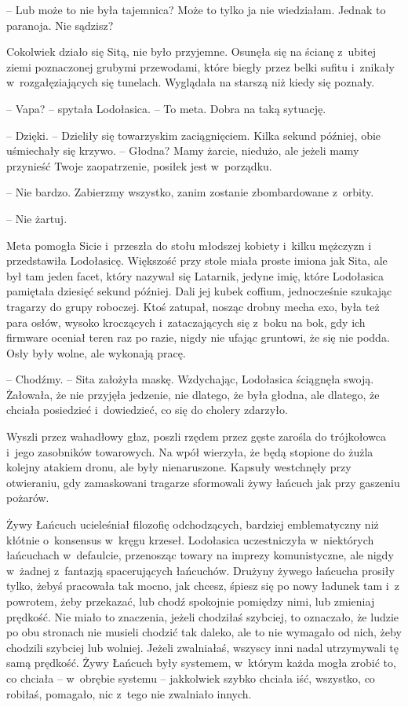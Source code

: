 \documentclass[oneside,polish,11pt,sfheadings]{mwbk}
\begin{document}
-- Lub może to nie była tajemnica? Może to tylko ja nie wiedziałam.
Jednak to paranoja. Nie sądzisz?

Cokolwiek działo się Sitą, nie było przyjemne. Osunęła się na ścianę z~ubitej ziemi poznaczonej grubymi przewodami, które biegły przez belki
sufitu i~znikały w~rozgałęziających się tunelach. Wyglądała na starszą
niż kiedy się poznały.

-- Vapa? -- spytała Lodołasica. -- To meta. Dobra na taką sytuację.

-- Dzięki. -- Dzieliły się towarzyskim zaciągnięciem. Kilka sekund
później, obie uśmiechały się krzywo. -- Głodna? Mamy żarcie, niedużo, ale
jeżeli mamy przynieść Twoje zaopatrzenie, posiłek jest w~porządku.

-- Nie bardzo. Zabierzmy wszystko, zanim zostanie zbombardowane z~orbity.

-- Nie żartuj.

Meta pomogła Sicie i~przeszła do stołu młodszej kobiety i~kilku mężczyzn
i przedstawiła Lodołasicę. Większość przy stole miała proste imiona jak
Sita, ale był tam jeden facet, który nazywał się Latarnik, jedyne imię,
które Lodołasica pamiętała dziesięć sekund później. Dali jej kubek
coffium, jednocześnie szukając tragarzy do grupy roboczej. Ktoś zatupał,
nosząc drobny mecha exo, była też para osłów, wysoko kroczących i~zataczających się z~boku na bok, gdy ich firmware oceniał teren raz po
razie, nigdy nie ufając gruntowi, że się nie podda. Osły były wolne, ale
wykonają pracę.

-- Chodźmy. -- Sita założyła maskę. Wzdychając, Lodołasica ściągnęła
swoją. Żałowała, że nie przyjęła jedzenie, nie dlatego, że była głodna,
ale dlatego, że chciała posiedzieć i~dowiedzieć, co się do cholery
zdarzyło.

Wyszli przez wahadłowy głaz, poszli rzędem przez gęste zarośla do
trójkołowca i~jego zasobników towarowych. Na wpół wierzyła, że będą
stopione do żużla kolejny atakiem dronu, ale były nienaruszone. Kapsuły
westchnęły przy otwieraniu, gdy zamaskowani tragarze sformowali żywy
łańcuch jak przy gaszeniu pożarów.

Żywy Łańcuch ucieleśniał filozofię odchodzących, bardziej emblematyczny
niż kłótnie o~konsensus w~kręgu krzeseł. Lodołasica uczestniczyła w~niektórych łańcuchach w~defaulcie, przenosząc towary na imprezy
komunistyczne, ale nigdy w~żadnej z~fantazją spacerujących łańcuchów.
Drużyny żywego łańcucha prosiły tylko, żebyś pracowała tak mocno, jak
chcesz, śpiesz się po nowy ładunek tam i~z powrotem, żeby przekazać, lub
chodź spokojnie pomiędzy nimi, lub zmieniaj prędkość. Nie miało to
znaczenia, jeżeli chodziłaś szybciej, to oznaczało, że ludzie po obu
stronach nie musieli chodzić tak daleko, ale to nie wymagało od nich,
żeby chodzili szybciej lub wolniej. Jeżeli zwalniałaś, wszyscy inni
nadal utrzymywali tę samą prędkość. Żywy Łańcuch były systemem, w~którym
każda mogła zrobić to, co chciała -- w~obrębie systemu -- jakkolwiek
szybko chciała iść, wszystko, co robiłaś, pomagało, nic z~tego nie
zwalniało innych.
\end{document}
